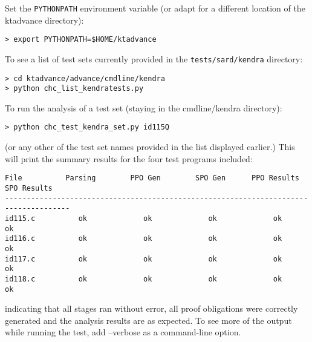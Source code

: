 \documentclass[11pt]{article}
\begin{document}
Set the {\tt PYTHONPATH} environment variable (or adapt for a different location
of the ktadvance directory):
\begin{verbatim}
> export PYTHONPATH=$HOME/ktadvance
\end{verbatim}
To see a list of test sets currently provided in the {\tt tests/sard/kendra}
directory:
\begin{verbatim}
> cd ktadvance/advance/cmdline/kendra
> python chc_list_kendratests.py
\end{verbatim}
To run the analysis of a test set (staying in the cmdline/kendra directory):
\begin{verbatim}
> python chc_test_kendra_set.py id115Q
\end{verbatim}
(or any other of the test set names provided in the list displayed earlier.)
This will print the summary results for the four test programs included:
\begin{small}
\begin{verbatim}
File          Parsing        PPO Gen        SPO Gen      PPO Results    SPO Results  
-------------------------------------------------------------------------------------
id115.c          ok             ok             ok             ok             ok      
id116.c          ok             ok             ok             ok             ok      
id117.c          ok             ok             ok             ok             ok      
id118.c          ok             ok             ok             ok             ok      
\end{verbatim}
\end{small}

indicating that all stages ran without error, all proof obligations were correctly
generated and the analysis results are as expected. 
To see more of the output while running the test, add --verbose as a command-line option.
\end{document}
